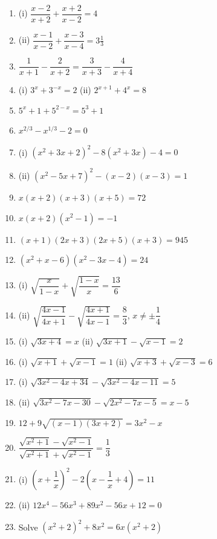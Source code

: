 \documentclass[12pt,a4paper]{article}
\begin{document}
\begin{enumerate}
    \item (i) \( \dfrac{x-2}{x+2} + \dfrac{x+2}{x-2} = 4 \)
    \item (ii) \( \dfrac{x-1}{x-2} + \dfrac{x-3}{x-4} = 3\frac{1}{3} \)
    \item \( \dfrac{1}{x+1} - \dfrac{2}{x+2} = \dfrac{3}{x+3} - \dfrac{4}{x+4} \)
    \item (i) \( 3^x + 3^{-x} = 2 \) \quad (ii) \( 2^{x+1} + 4^x = 8 \)
    \item \( 5^x + 1 + 5^{2-x} = 5^3 + 1 \)
    \item \( x^{2/3} - x^{1/3} - 2 = 0 \)
    \item (i) \( (x^2 + 3x + 2)^2 - 8(x^2 + 3x) - 4 = 0 \)
    \item (ii) \( (x^2 - 5x + 7)^2 - (x-2)(x-3) = 1 \)
    \item \( x(x+2)(x+3)(x+5) = 72 \)
    \item \( x(x+2)(x^2 - 1) = -1 \)
    \item \( (x+1)(2x+3)(2x+5)(x+3) = 945 \)
    \item \( (x^2 + x - 6)(x^2 - 3x - 4) = 24 \)
    \item (i) \( \sqrt{\dfrac{x}{1-x}} + \sqrt{\dfrac{1-x}{x}} = \dfrac{13}{6} \)
    \item (ii) \( \sqrt{\dfrac{4x-1}{4x+1}} - \sqrt{\dfrac{4x+1}{4x-1}} = \dfrac{8}{3} \), \( x \neq \pm \dfrac{1}{4} \)
    \item (i) \( \sqrt{3x+4} = x \) \quad (ii) \( \sqrt{3x+1} - \sqrt{x-1} = 2 \)
    \item (i) \( \sqrt{x+1} + \sqrt{x-1} = 1 \) \quad (ii) \( \sqrt{x+3} + \sqrt{x-3} = 6 \)
    \item (i) \( \sqrt{3x^2 - 4x + 34} - \sqrt{3x^2 - 4x - 11} = 5 \)
    \item (ii) \( \sqrt{3x^2 - 7x - 30} - \sqrt{2x^2 - 7x - 5} = x - 5 \)
    \item \( 12 + 9\sqrt{(x-1)(3x+2)} = 3x^2 - x \)
    \item \( \dfrac{\sqrt{x^2+1} - \sqrt{x^2-1}}{\sqrt{x^2+1} + \sqrt{x^2-1}} = \dfrac{1}{3} \)
    \item (i) \( \left(x + \dfrac{1}{x}\right)^2 - 2\left(x - \dfrac{1}{x} + 4\right) = 11 \)
    \item (ii) \( 12x^4 - 56x^3 + 89x^2 - 56x + 12 = 0 \)
    \item Solve \( (x^2 + 2)^2 + 8x^2 = 6x(x^2 + 2) \)
\end{enumerate}
\end{document}
